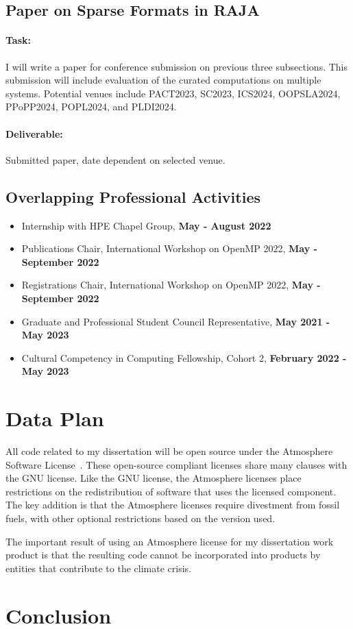 \documentclass{article}
\begin{document}
\subsection{Paper on Sparse Formats in RAJA}

\paragraph{Task:}
I will write a paper for conference submission on previous three subsections. 
This submission will include evaluation of the curated computations on multiple systems.
Potential venues include PACT2023, SC2023, ICS2024,  OOPSLA2024, PPoPP2024, POPL2024, and PLDI2024.


\paragraph{Deliverable:} Submitted paper, date dependent on selected venue.


\subsection{Overlapping Professional Activities}
\begin{itemize}
\item Internship with HPE Chapel Group, \textbf{May - August 2022} 
\item Publications Chair, International Workshop on OpenMP 2022, \textbf{May - September 2022}
\item Registrations Chair, International Workshop on OpenMP 2022, \textbf{May - September 2022}
\item Graduate and Professional Student Council Representative, \textbf{May 2021 - May 2023}
\item Cultural Competency in Computing Fellowship, Cohort 2, \textbf{February 2022 - May 2023}
\end{itemize}

\section{Data Plan}
\label{Sec:DataPlan}
All code related to my dissertation will be open source under the Atmosphere Software License~\cite{atmospherelicense}. 
These open-source compliant licenses share many clauses with the GNU license. 
Like the GNU license, the Atmosphere licenses place restrictions on the redistribution of software that uses the licensed component.
The key addition is that the Atmosphere licenses require divestment from fossil fuels, with other optional restrictions based on the version used. 

The important result of using an Atmosphere license for my dissertation work product is that the resulting code cannot be incorporated into products by entities that contribute to the climate crisis.
\section{Conclusion}




\end{document}
